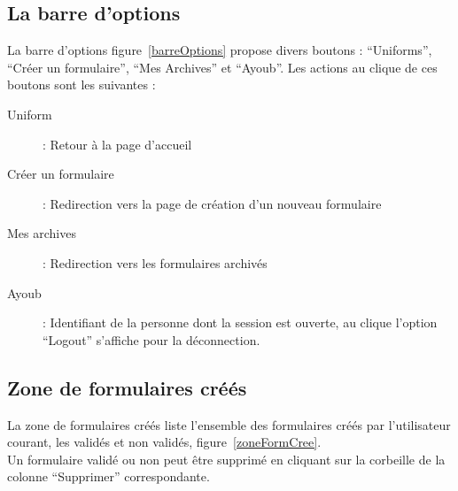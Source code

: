 \documentclass[a4paper,11pt,final]{report}
\begin{document}
\subsection{La barre d'options}\label{sec:barreOption}
La barre d'options figure~\ref{barreOptions} propose divers boutons : ``Uniforms'', ``Créer un formulaire'', ``Mes Archives'' et ``Ayoub''. Les actions au clique de ces boutons sont les suivantes :
\begin{description}
	\item [Uniform] : Retour à la page d'accueil
	\item [Créer un formulaire] : Redirection vers la page de création d'un nouveau formulaire
	\item [Mes archives] : Redirection vers les formulaires archivés
	\item [Ayoub] : Identifiant de la personne dont la session est ouverte, au clique l'option ``Logout'' s'affiche pour la déconnection.
\end{description}

\noindent\begin{minipage}{\linewidth}%
\label{barreOptions}
\end{minipage}

\subsection{Zone de formulaires créés}
La zone de formulaires créés liste l'ensemble des formulaires créés par l'utilisateur courant, les validés et non validés, figure~\ref{zoneFormCree}.\\
Un formulaire validé ou non peut être supprimé en cliquant sur la corbeille de la colonne ``Supprimer'' correspondante.

\noindent\begin{minipage}{\linewidth}%
\label{zoneFormCree}
\end{minipage}
\end{document}
